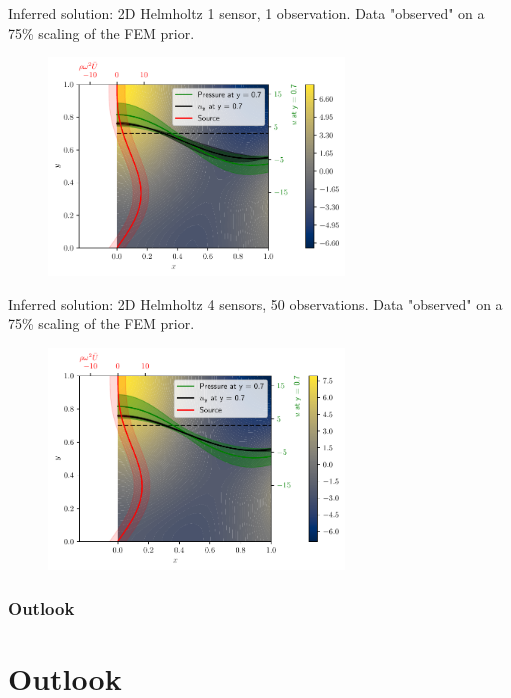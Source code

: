 \documentclass[fleqn,11pt,aspectratio=43]{beamer}
\begin{document}
\begin{frame}{Inferred solution: 2D Helmholtz}
1 sensor, 1 observation. Data "observed" on a 75\% scaling of the FEM prior.
      	\begin{figure}[h]
		\begin{center}
		\includegraphics[width=0.7\textwidth]{SolutionCustomPosterior1P1O}
		\end{center}
		\end{figure}

	\end{frame}

\begin{frame}{Inferred solution: 2D Helmholtz}
4 sensors, 50 observations. Data "observed" on a 75\% scaling of the FEM prior.
      	\begin{figure}[h]
		\begin{center}
		\includegraphics[width=0.7\textwidth]{SolutionCustomPosterior4P50O}
		\end{center}
		\end{figure}

	\end{frame}


\section{Outlook}

\part{Outlook}
\begin{frame}[plain]
  \partpage
\end{frame}
\end{document}
